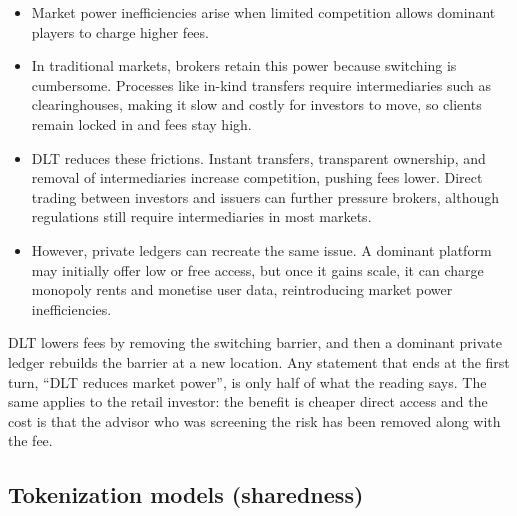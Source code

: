 \begin{itemize}
\item Market power inefficiencies arise when limited competition allows dominant players to
charge higher fees.
\item In traditional markets, brokers retain this power because switching is cumbersome.
Processes like in-kind transfers require intermediaries such as clearinghouses, making it slow
and costly for investors to move, so clients remain locked in and fees stay high.
\item DLT reduces these frictions. Instant transfers, transparent ownership, and removal of
intermediaries increase competition, pushing fees lower. Direct trading between investors and
issuers can further pressure brokers, although regulations still require intermediaries in
most markets.
\item However, private ledgers can recreate the same issue. A dominant platform may initially
offer low or free access, but once it gains scale, it can charge monopoly rents and monetise
user data, reintroducing market power inefficiencies.
\end{itemize}

\begin{citrapbox}[title={The argument turns around twice}]
DLT lowers fees by removing the switching barrier, and then a dominant private ledger rebuilds
the barrier at a new location. Any statement that ends at the first turn, ``DLT reduces market
power'', is only half of what the reading says. The same applies to the retail investor: the
benefit is cheaper direct access and the cost is that the advisor who was screening the risk
has been removed along with the fee.
\end{citrapbox}


\subsection*{Tokenization models (sharedness)}

